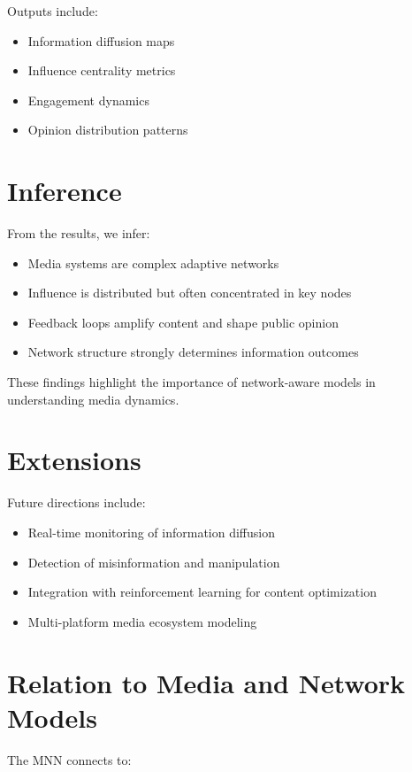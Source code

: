 \documentclass[12pt]{article}
\begin{document}
Outputs include:

\begin{itemize}
\item Information diffusion maps
\item Influence centrality metrics
\item Engagement dynamics
\item Opinion distribution patterns
\end{itemize}

\section{Inference}

From the results, we infer:

\begin{itemize}
\item Media systems are complex adaptive networks
\item Influence is distributed but often concentrated in key nodes
\item Feedback loops amplify content and shape public opinion
\item Network structure strongly determines information outcomes
\end{itemize}

These findings highlight the importance of network-aware models in understanding media dynamics.

\section{Extensions}

Future directions include:

\begin{itemize}
\item Real-time monitoring of information diffusion
\item Detection of misinformation and manipulation
\item Integration with reinforcement learning for content optimization
\item Multi-platform media ecosystem modeling
\end{itemize}

\section{Relation to Media and Network Models}

The MNN connects to:
\end{document}
